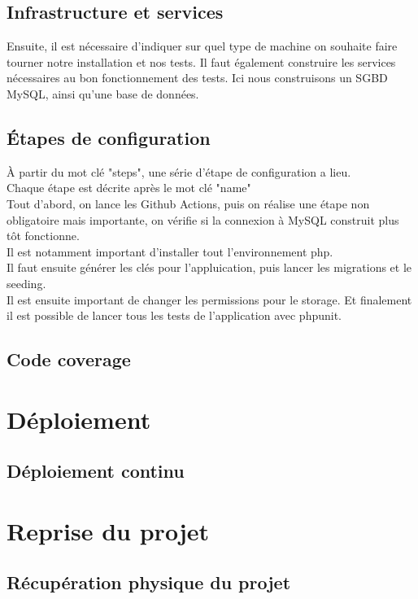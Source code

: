 \documentclass[
    iai, %
    il, %
]{heig-tb}
\begin{document}
\section{Infrastructure et services}
Ensuite, il est nécessaire d'indiquer sur quel type de machine on souhaite faire tourner notre
installation et nos tests. Il faut également construire les services nécessaires au bon
fonctionnement des tests. Ici nous construisons un SGBD MySQL, ainsi qu'une base de données.\\

\section{Étapes de configuration}

À partir du mot clé "steps", une série d'étape de configuration a lieu.\\
Chaque étape est décrite après le mot clé "name"\\
Tout d'abord, on lance les Github Actions, puis on réalise une étape non obligatoire mais
importante, on vérifie si la connexion à MySQL construit plus tôt fonctionne.\\
Il est notamment important d'installer tout l'environnement php.\\
Il faut ensuite générer les clés pour l'appluication, puis lancer les migrations et le
seeding.\\
Il est ensuite important de changer les permissions pour le storage. Et finalement il est possible
de lancer tous les tests de l'application avec phpunit.

\section{Code coverage}

\chapter{Déploiement}

\section{Déploiement continu}

\chapter{Reprise du projet}

\section{Récupération physique du projet}
\end{document}
